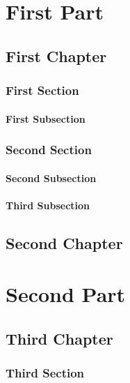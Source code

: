 \documentclass{book}
\begin{document}
\tableofcontents

\part{First Part}
\chapter{First Chapter}
\section{First Section}
\subsection{First Subsection}
\section{Second Section}
\subsection{Second Subsection}
\subsection{Third Subsection}
\chapter{Second Chapter}

\part{Second Part}
\chapter{Third Chapter}
\section{Third Section}
\end{document}
